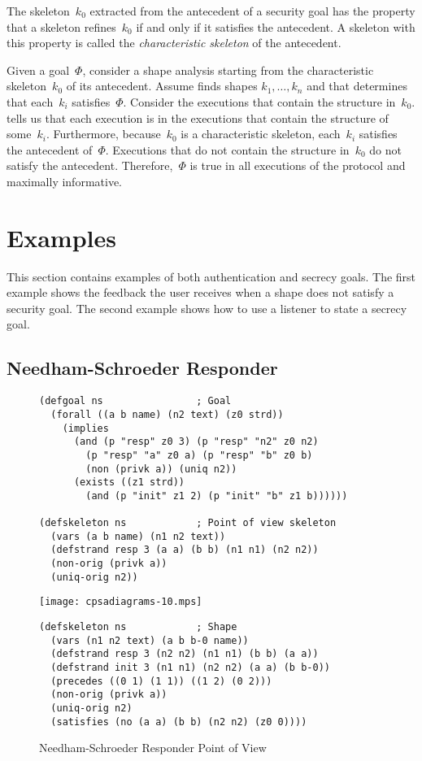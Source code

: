 The skeleton~$k_0$ extracted from the antecedent of a security goal
has the property that a skeleton refines~$k_0$ if and only if it
satisfies the antecedent.  A skeleton with this property is called the
\emph{characteristic skeleton} of the antecedent.

Given a goal~\(\Phi\), consider a shape analysis starting from the
characteristic skeleton~$k_0$ of its antecedent.  Assume {\cpsa} finds
shapes $k_1,\ldots,k_n$ and that {\cpsa} determines that each~$k_i$
satisfies~$\Phi$.  Consider the executions that contain the structure
in~$k_0$.  {\cpsa} tells us that each execution is in the executions
that contain the structure of some~$k_i$.  Furthermore, because~$k_0$
is a characteristic skeleton, each~$k_i$ satisfies the antecedent
of~$\Phi$.  Executions that do not contain the structure in~$k_0$ do
not satisfy the antecedent.  Therefore,~$\Phi$ is true in all
executions of the protocol and maximally informative.

\section{Examples}\label{sec:examples}

This section contains examples of both authentication and secrecy
goals.  The first example shows the feedback the user receives when a
shape does not satisfy a security goal.  The second example shows how
to use a listener to state a secrecy goal.

\subsection{Needham-Schroeder Responder}\label{sec:ns resp}

\begin{figure}
\begin{verbatim}
(defgoal ns                ; Goal
  (forall ((a b name) (n2 text) (z0 strd))
    (implies
      (and (p "resp" z0 3) (p "resp" "n2" z0 n2)
        (p "resp" "a" z0 a) (p "resp" "b" z0 b)
        (non (privk a)) (uniq n2))
      (exists ((z1 strd))
        (and (p "init" z1 2) (p "init" "b" z1 b))))))

(defskeleton ns            ; Point of view skeleton
  (vars (a b name) (n1 n2 text))
  (defstrand resp 3 (a a) (b b) (n1 n1) (n2 n2))
  (non-orig (privk a))
  (uniq-orig n2))
\end{verbatim}
\begin{center}
\texttt{[image: cpsadiagrams-10.mps]}
\end{center}
\begin{verbatim}
(defskeleton ns            ; Shape
  (vars (n1 n2 text) (a b b-0 name))
  (defstrand resp 3 (n2 n2) (n1 n1) (b b) (a a))
  (defstrand init 3 (n1 n1) (n2 n2) (a a) (b b-0))
  (precedes ((0 1) (1 1)) ((1 2) (0 2)))
  (non-orig (privk a))
  (uniq-orig n2)
  (satisfies (no (a a) (b b) (n2 n2) (z0 0))))
\end{verbatim}
\caption{Needham-Schroeder Responder Point of View}
\label{fig:ns resp}
\end{figure}

